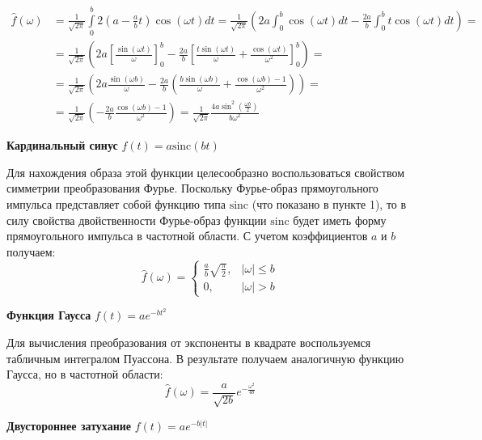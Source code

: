 \documentclass[a4paper,14pt]{extarticle}
\begin{document}
\begin{equation*}
\begin{split}
    \hat{f}(\omega) &= \frac{1}{\sqrt{2\pi}}\int\limits_{0}^{b} 2\left(a-\frac{a}{b}t\right) \cos(\omega t)dt = \frac{1}{\sqrt{2\pi}}\left(2a \int_{0}^{b} \cos(\omega t) dt - \frac{2a}{b} \int_{0}^{b} t \cos(\omega t) dt\right) =\\
    &= \frac{1}{\sqrt{2\pi}}\left(2a\left[ \frac{\sin(\omega t)}{\omega} \right]_{0}^{b} - \frac{2a}{b}\left[ \frac{t \sin(\omega t)}{\omega} + \frac{\cos(\omega t)}{\omega^2} \right]_{0}^{b}\right) =\\
    &= \frac{1}{\sqrt{2\pi}}\left(2a\frac{\sin(\omega b)}{\omega}  - \frac{2a}{b}\left(\frac{b \sin(\omega b)}{\omega} + \frac{\cos(\omega b) - 1}{\omega^2}\right)\right) =\\
    &=\frac{1}{\sqrt{2\pi}} \left(-\frac{2a}{b} \frac{\cos(\omega b) - 1}{\omega^2} \right) = \frac{1}{\sqrt{2\pi}}\frac{4a \sin^2\left(\frac{\omega b}{2}\right)}{b\omega^2}
\end{split}
\end{equation*}

\newpage

\textbf{Кардинальный синус} $f(t) = a \text{sinc}(bt)$

Для нахождения образа этой функции целесообразно воспользоваться свойством симметрии преобразования Фурье. Поскольку Фурье-образ прямоугольного импульса представляет собой функцию типа $\text{sinc}$ (что показано в пункте 1), то в силу свойства двойственности Фурье-образ функции $\text{sinc}$ будет иметь форму прямоугольного импульса в частотной области. С учетом коэффициентов $a$ и $b$ получаем:
\begin{equation*}
    \hat{f}(\omega) = \begin{cases} 
\frac{a}{b}\sqrt{\frac{\pi}{2}}, & |\omega| \le b \\ 
0, & |\omega| > b 
\end{cases}
\end{equation*}

\textbf{Функция Гаусса} $f(t) = ae^{-bt^2}$

Для вычисления преобразования от экспоненты в квадрате воспользуемся табличным интегралом Пуассона. В результате получаем аналогичную функцию Гаусса, но в частотной области:
\begin{equation*}
    \hat{f}(\omega) = \frac{a}{\sqrt{2b}}e^{-\frac{\omega^2}{4b}}
\end{equation*}

\textbf{Двустороннее затухание} $f(t) = ae^{-b|t|}$
\end{document}
